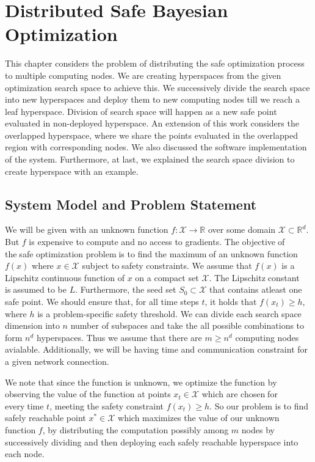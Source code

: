 \chapter{Distributed Safe Bayesian Optimization}
\label{ch:distbo}


This chapter considers the problem of distributing the safe optimization process to multiple computing nodes. We are creating hyperspaces from the given optimization search space to achieve this. We successively divide the search space into new hyperspaces and deploy them to new computing nodes till we reach a leaf hyperspace. Division of search space will happen as a new safe point evaluated in non-deployed hyperspace. An extension of this work considers the overlapped hyperspace, where we share the points evaluated in the overlapped region with corresponding nodes. We also discussed the software implementation of the system. Furthermore, at last, we explained the search space division to create hyperspace with an example.

\section{System Model and Problem Statement}
\par We will be given with an unknown function $f: \mathcal{X} \to \mathbb{R}$ over some domain $\mathcal{X} \subset \mathbb{R}^d$. But $f$ is expensive to compute and no access to gradients.
The objective\textcolor{white}{i}of the\textcolor{white}{i}safe optimization problem\textcolor{white}{i}is to find the maximum\textcolor{white}{i}of an unknown function $f(x)$ where $x \in \mathcal{X}$ subject to\textcolor{white}{i}safety constraints. 
We assume that $f(x)$ is a Lipschitz continuous function of $x$ on a compact set $\mathcal{X}$. The Lipschitz\textcolor{white}{i}constant is\textcolor{white}{i}assumed to be $L$.
Furthermore, the seed set $S_0 \subset \mathcal{X}$ that contains atleast one safe point. 
We should ensure that, for all time steps $t$, it holds that $f(x_t) \geq h$, where $h$ is a problem-specific safety threshold.
We can divide each search space dimension into $n$ number of subspaces and take the all possible combinations to form $n^d$ hyperspaces. Thus we assume that there are $m \ge n^d$ computing nodes avialable. 
Additionally, we will be having time and communication constraint for a given network connection.
\par We\textcolor{white}{i}note that since the\textcolor{white}{i}function is unknown, we optimize the\textcolor{white}{i}function by observing\textcolor{white}{i}the value of the function at points $x_t \in \mathcal{X}$ which are chosen\textcolor{white}{i}for every\textcolor{white}{i}time $t$, meeting the safety constraint $f(x_t) \geq h$.
So our problem is to find safely reachable point $x^* \in \mathcal{X}$ which maximizes the value of our unknown function $f$, by distributing the computation possibly among $m$ nodes by successively dividing and then deploying each safely reachable hyperspace into each node.


